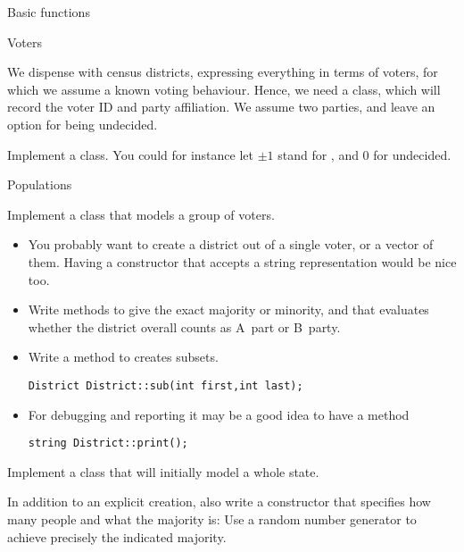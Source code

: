  {Basic functions}

 {Voters}

We dispense with census districts, expressing everything in terms of
voters, for which we assume a known voting behaviour. Hence, we need a
 class, which will record the voter ID and party
affiliation. We assume two parties, and leave an option for being undecided.

\begin{exercise}
  Implement a  class. You could for instance let $\pm1$ stand
  for , and 0 for undecided.
\end{exercise}

 {Populations}

\begin{exercise}
  Implement a  class that models a group of voters.
  \begin{itemize}
    \item You probably want to create a district out of a single
      voter, or a vector of them. Having a constructor that accepts a
      string representation would be nice too.
    \item Write methods  to give the exact majority or
      minority, and  that evaluates whether the district
      overall counts as A~part or B~party.
    \item Write a  method to creates subsets.
\begin{verbatim}
District District::sub(int first,int last);
\end{verbatim}
  \item For debugging and reporting it may be a good idea to have a method
\begin{verbatim}
string District::print();
\end{verbatim}
  \end{itemize}
\end{exercise}

\begin{exercise}
  Implement a  class that will initially model a whole state.

  In addition to an explicit creation, also write a constructor that
  specifies how many people and what the majority is:
  Use a random number generator to achieve precisely the indicated majority.
\end{exercise}

